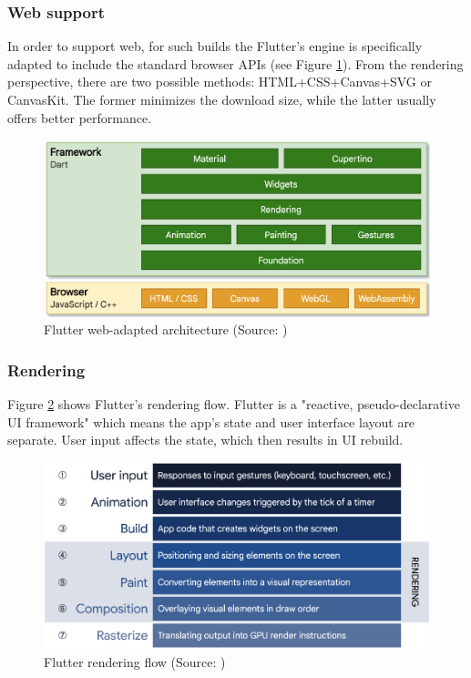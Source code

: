 \subsubsection*{Web support}

In order to support web, for such builds the Flutter's engine is specifically adapted to include the standard browser APIs (see Figure \ref{fig:flutter_web_architecture}). From the rendering perspective, there are two possible methods: HTML+CSS+Canvas+SVG or CanvasKit. The former minimizes the download size, while the latter usually offers better performance.

\begin{figure}[h]
    \centering
    \includegraphics[width=.77\textwidth]{img/flutter_web_architecture}
    \caption{Flutter web-adapted architecture (Source: \cite{flutter_docs_architecture})}
    \label{fig:flutter_web_architecture}
\end{figure}

\subsubsection*{Rendering}

Figure \ref{fig:flutter_render_flow} shows Flutter's rendering flow. Flutter is a "reactive, pseudo-declarative UI framework" which means the app's state and user interface layout are separate. User input affects the state, which then results in UI rebuild. 

\begin{figure}[h]
    \centering
    \includegraphics[width=\textwidth]{img/flutter_render_pipeline}
    \caption{Flutter rendering flow (Source: \cite{flutter_docs_architecture})}
    \label{fig:flutter_render_flow}
\end{figure}

